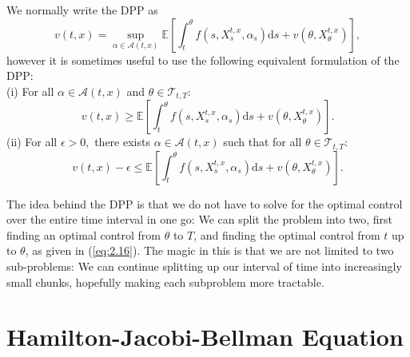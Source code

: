 \begin{remark}
    We normally write the DPP as 
    \begin{equation}\label{eq:2.16}
        v(t,x)=\sup_{\alpha\in\mathcal{A}(t,x)}\mathbb{E}\left[\int_{t}^\theta f(s,X_s^{t,x},\alpha_s)\mathrm ds+v(\theta,X_\theta^{t,x})\right],
    \end{equation}
    however it is sometimes useful to use the following equivalent formulation of the DPP:\\
    (i) For all $\alpha\in\mathcal{A}(t,x)$ and $\theta\in\mathcal{T}_{t,T}$:
    \begin{equation}\label{eq:2.17}
        v(t,x)\geq\mathbb{E}\left[\int_{t}^\theta f(s,X_s^{t,x},\alpha_s)\mathrm ds+v(\theta,X_\theta^{t,x})\right].
    \end{equation}
    (ii) For all $\epsilon>0,$ there exists $\alpha\in\mathcal{A}(t,x)$ such that for all $\theta\in\mathcal{T}_{t,T}$:
    \begin{equation}
        v(t,x)-\epsilon\leq\mathbb{E}\left[\int_{t}^\theta f(s,X_s^{t,x},\alpha_s)\mathrm ds+v(\theta,X_\theta^{t,x})\right].
    \end{equation}
\end{remark}

The idea behind the DPP is that we do not have to solve for the optimal control over 
the entire time interval in one go: We can split the problem into two, first finding 
an optimal control from $\theta$ to $T$, and finding the optimal control from $t$ up
to $\theta$, as given in (\ref{eq:2.16}). The magic in this is that we are not limited 
to two sub-problems: We can continue splitting up our interval of time into increasingly 
small chunks, hopefully making each subproblem more tractable.

\section{Hamilton-Jacobi-Bellman Equation}\label{sec:2.5}

